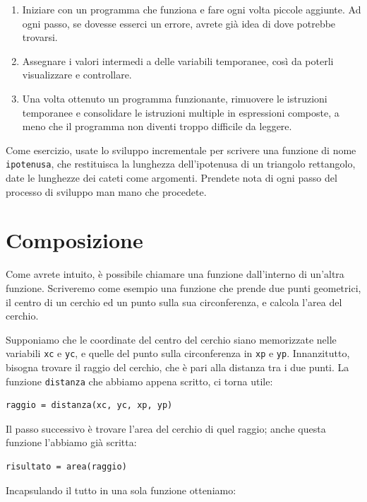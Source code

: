 \documentclass[10pt]{book}
\begin{document}
\begin{enumerate}

\item Iniziare con un programma che funziona e fare ogni volta piccole aggiunte. Ad ogni passo, se dovesse esserci un errore, avrete già idea di dove potrebbe trovarsi.

\item Assegnare i valori intermedi a delle variabili temporanee, così da poterli visualizzare e controllare.

\item Una volta ottenuto un programma funzionante, rimuovere le istruzioni temporanee e consolidare le istruzioni multiple in espressioni composte, a meno che il programma non diventi troppo difficile da leggere.

\end{enumerate}


Come esercizio, usate lo sviluppo incrementale per scrivere una funzione
di nome {\tt ipotenusa}, che restituisca la lunghezza dell'ipotenusa di un
triangolo rettangolo, date le lunghezze dei cateti come argomenti.
Prendete nota di ogni passo del processo di sviluppo man mano che procedete.

\section{Composizione}

Come avrete intuito, è possibile chiamare una funzione dall'interno di un'altra funzione. Scriveremo come esempio una funzione che prende due punti geometrici, il centro di un cerchio ed un punto sulla sua circonferenza, e calcola l'area del cerchio.

Supponiamo che le coordinate del centro del cerchio siano memorizzate nelle variabili {\tt xc} e {\tt yc}, e quelle del punto sulla circonferenza in {\tt xp} e {\tt yp}. Innanzitutto, bisogna trovare il raggio del cerchio, che è pari alla distanza tra i due punti. La funzione {\tt distanza} che abbiamo appena scritto, ci torna utile:

\begin{verbatim}
raggio = distanza(xc, yc, xp, yp)
\end{verbatim}
%
Il passo successivo è trovare l'area del cerchio di quel raggio; anche questa funzione l'abbiamo già scritta:

\begin{verbatim}
risultato = area(raggio)
\end{verbatim}
%
Incapsulando il tutto in una sola funzione otteniamo:
\end{document}
